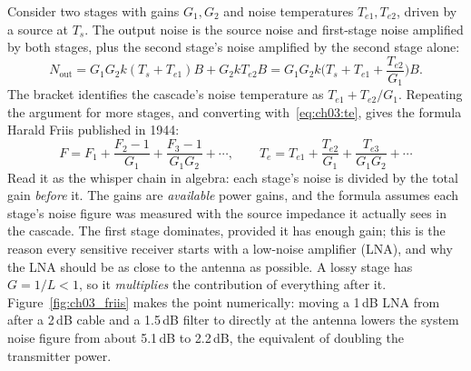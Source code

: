 Consider two stages with gains $G_1,G_2$ and noise temperatures $T_{e1},T_{e2}$, driven by a source at
$T_s$. The output noise is the source noise and first-stage noise amplified by both stages, plus the
second stage's noise amplified by the second stage alone:
\[
N_{\text{out}}=G_1G_2k(T_s+T_{e1})B+G_2kT_{e2}B=G_1G_2k\Big(T_s+T_{e1}+\frac{T_{e2}}{G_1}\Big)B .
\]
The bracket identifies the cascade's noise temperature as $T_{e1}+T_{e2}/G_1$. Repeating the argument
for more stages, and converting with~\eqref{eq:ch03:te}, gives the formula Harald Friis published in 1944:
\begin{equation}
F=F_1+\frac{F_2-1}{G_1}+\frac{F_3-1}{G_1G_2}+\cdots,\qquad
T_e=T_{e1}+\frac{T_{e2}}{G_1}+\frac{T_{e3}}{G_1G_2}+\cdots
\label{eq:ch03:friis}
\end{equation}
Read it as the whisper chain in algebra: each stage's noise is divided by the total gain \emph{before}
it. The gains are \emph{available} power gains, and the formula assumes each stage's noise figure was
measured with the source impedance it actually sees in the cascade. The first stage dominates, provided
it has enough gain; this is the reason every sensitive receiver starts with a low-noise amplifier (LNA),
and why the LNA should be as close to the antenna as possible. A lossy stage has $G=1/L<1$, so it
\emph{multiplies} the contribution of everything after it. Figure~\ref{fig:ch03_friis} makes the point
numerically: moving a 1\,dB LNA from after a 2\,dB cable and a 1.5\,dB filter to directly at the antenna
lowers the system noise figure from about 5.1\,dB to 2.2\,dB, the equivalent of doubling the transmitter
power.

